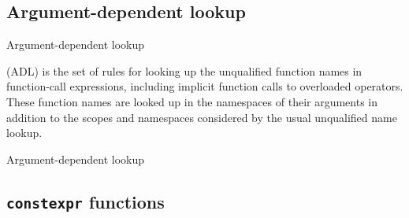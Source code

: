 \subsection{Argument-dependent lookup}


\begin{frame}{Argument-dependent lookup}{}
  \begin{definition}
     (ADL) is the set of rules for looking up the unqualified function names in function-call expressions, including implicit function calls to overloaded operators. These function names are looked up in the namespaces of their arguments in addition to the scopes and namespaces considered by the usual unqualified name lookup.
  \end{definition}
\end{frame}

\begin{frame}{Argument-dependent lookup}{}
  \begin{example}
  \end{example}
\end{frame}


\subsection{\texttt{constexpr} functions}

